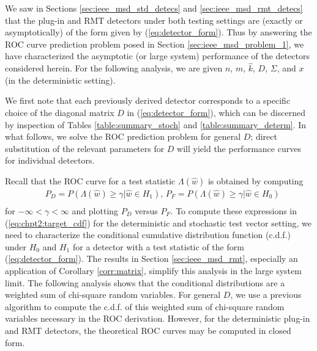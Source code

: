We saw in Sections \ref{sec:ieee_msd_std_detecs} and \ref{sec:ieee_msd_rmt_detecs} that the plug-in and RMT detectors under both testing settings are (exactly or asymptotically) of the form given by (\ref{eq:detector_form}). Thus by answering the ROC curve prediction problem posed in Section \ref{sec:ieee_msd_problem_1}, we have characterized the asymptotic (or large system) performance of the detectors considered herein. For the following analysis, we are given $n$, $m$, $\widehat{k}$, $D$, $\Sigma$, and $x$ (in the deterministic setting).

We first note that each previously derived detector corresponds to a specific choice of the diagonal matrix $D$ in (\ref{eq:detector_form}), which can be discerned by inspection of Tables \ref{table:summary_stoch} and \ref{table:summary_determ}. In what follows, we solve the ROC prediction problem for general $D$; direct substitution of the relevant parameters for $D$ will yield the performance curves for individual detectors. 

Recall that the ROC curve \cite{fawcett2006introduction} for a test statistic $\Lambda(\widehat{w})$ is obtained by computing
\begin{equation}
\begin{aligned}\label{eq:chpt2:target_cdf}
&P_D = P(\Lambda(\widehat{w}) \geq \gamma| \widehat{w}\in H_1) ,\, P_F = P(\Lambda(\widehat{w}) \geq \gamma| \widehat{w}\in H_0)\\
\end{aligned}
\end{equation}
for $-\infty<\gamma<\infty$ and plotting $P_D$ versus $P_F$. To compute these expressions in (\ref{eq:chpt2:target_cdf}) for the deterministic and stochastic test vector setting, we need to characterize the conditional cumulative distribution function (c.d.f.) under $H_0$ and $H_1$ for a detector with a test statistic of the form (\ref{eq:detector_form}).
The results in Section \ref{sec:ieee_msd_rmt}, especially an application of Corollary \ref{corr:matrix}, simplify this analysis in the large system limit. The following analysis shows that the conditional distributions are a weighted sum of chi-square random variables. For general $D$, we use a previous algorithm to compute the c.d.f. of this weighted sum of chi-square random variables necessary in the ROC derivation. However, for the deterministic plug-in and RMT detectors, the theoretical ROC curves may be computed in closed form. 

